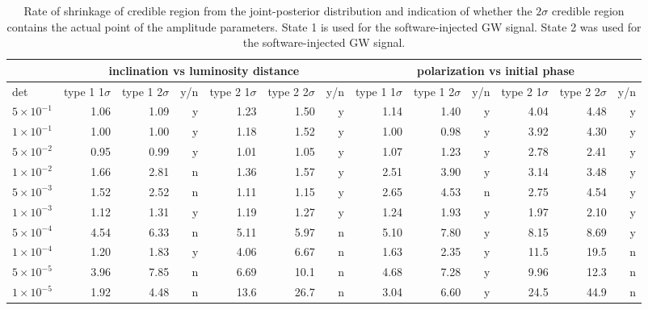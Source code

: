 \documentclass[%
 aps,
 prd,
 amsmath,amssymb,
 reprint,%
superscriptaddress
]{revtex4-1}
\begin{document}
\begin{table*}[htb]
   \begin{tabular}{|l||r|r|r||r|r|r||r|r|r||r|r|r|} \hline
    \multicolumn{1}{|l||}{} & \multicolumn{6}{c||}{inclination vs luminosity distance} & \multicolumn{6}{c|}{polarization vs initial phase}\\ \hline
    det & type 1 1$\sigma$ & type 1 2$\sigma$ &y/n &type 2 1$\sigma$ & type 2 2$\sigma$ &y/n &type 1 1$\sigma$ & type 1 2$\sigma$ &y/n & type 2 1$\sigma$ &type 2 2$\sigma$&y/n \\ \hline \hline
    $5\times10^{-1}$ & 1.06 & 1.09&y & 1.23 & 1.50&y & 1.14 & 1.40&y & 4.04 & 4.48&y \\ \hline
    $1\times10^{-1}$ & 1.00 & 1.00&y & 1.18 & 1.52&y & 1.00 & 0.98&y & 3.92 & 4.30&y \\ \hline
    $5\times10^{-2}$ & 0.95 & 0.99&y & 1.01 & 1.05&y & 1.07 & 1.23&y & 2.78 & 2.41&y \\ \hline
    $1\times10^{-2}$ & 1.66 & 2.81&n & 1.36 & 1.57&y & 2.51 & 3.90&y & 3.14 & 3.48&y \\ \hline
    $5\times10^{-3}$ & 1.52 & 2.52&n & 1.11 & 1.15&y & 2.65 & 4.53&n & 2.75 & 4.54&y \\ \hline
    $1\times10^{-3}$ & 1.12 & 1.31&y & 1.19 & 1.27&y & 1.24 & 1.93&y & 1.97 & 2.10&y \\ \hline
    $5\times10^{-4}$ & 4.54 & 6.33&n & 5.11 & 5.97&n & 5.10 & 7.80&y & 8.15 & 8.69&y \\ \hline
    $1\times10^{-4}$ & 1.20 & 1.83&y & 4.06 & 6.67&n & 1.63 & 2.35&y & 11.5 & 19.5&n \\ \hline
    $5\times10^{-5}$ & 3.96 & 7.85&n & 6.69 & 10.1&n & 4.68 & 7.28&y & 9.96 & 12.3&n \\ \hline
    $1\times10^{-5}$ & 1.92 & 4.48&n & 13.6 & 26.7&n & 3.04 & 6.60&y & 24.5 & 44.9&n \\ \hline
   \end{tabular}
 \caption{Rate of shrinkage of credible region from the joint-posterior distribution and indication of whether the $2\sigma$ credible region contains the actual point of the amplitude parameters. State 1 is used for the software-injected GW signal. State 2 was used for the software-injected GW signal.\label{ken-short_thesis-tab:5}}
\end{table*}
\end{document}
